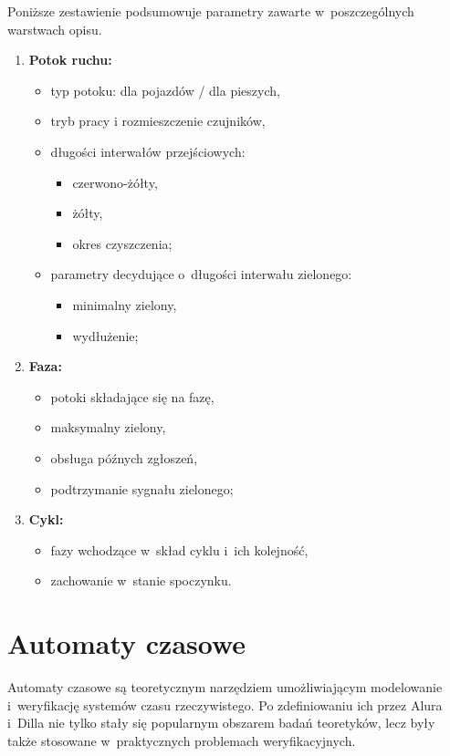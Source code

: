 \documentclass{pracamgr}
\theoremstyle{plain}
\begin{document}
Poniższe zestawienie podsumowuje parametry zawarte w~poszczególnych
warstwach opisu.
\begin{enumerate}
  \item \textbf{Potok ruchu:}
  \begin{itemize}
    \item typ potoku: dla pojazdów / dla pieszych,
    \item tryb pracy i rozmieszczenie czujników,
    \item długości interwałów przejściowych:
    \begin{itemize}
      \item czerwono-żółty,
      \item żółty,
      \item okres czyszczenia;
    \end{itemize}
    \item parametry decydujące o~długości interwału zielonego:
    \begin{itemize}
      \item minimalny zielony,
      \item wydłużenie;
    \end{itemize}
  \end{itemize}
  \item \textbf{Faza:}
  \begin{itemize}
    \item potoki składające się na fazę,
    \item maksymalny zielony,
    \item obsługa późnych zgłoszeń,
    \item podtrzymanie sygnału zielonego;
  \end{itemize}
  \item \textbf{Cykl:}
  \begin{itemize}
    \item fazy wchodzące w~skład cyklu i~ich kolejność,
    \item zachowanie w~stanie spoczynku.
  \end{itemize}
\end{enumerate}

\chapter{Automaty czasowe}
\label{c:ta}
Automaty czasowe są teoretycznym narzędziem umożliwiającym modelowanie
i~weryfikację systemów czasu rzeczywistego. Po zdefiniowaniu ich przez
Alura i~Dilla \cite{alur-dill} nie tylko stały się popularnym obszarem
badań teoretyków, lecz były także stosowane w~praktycznych problemach
weryfikacyjnych.
\end{document}

